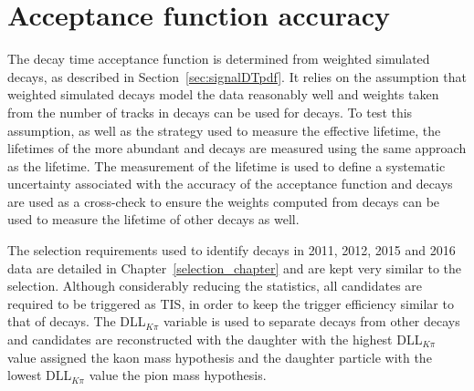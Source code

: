 \section{Acceptance function accuracy}
\label{sec:accptsyst}
The \bsmumu decay time acceptance function is determined from weighted simulated decays, as described in Section~\ref{sec:signalDTpdf}. It relies on the assumption that weighted simulated decays model the data reasonably well and weights taken from the number of tracks in \bdkpi decays can be used for \bsmumu decays. To test this assumption, as well as the strategy used to measure the \bsmumu effective lifetime, the lifetimes of the more abundant \bdkpi and \bskk decays are measured using the same approach as the \bsmumu lifetime.
The measurement of the \bdkpi lifetime is used to define a systematic uncertainty associated with the accuracy of the acceptance function and \bskk decays are used as a cross-check to ensure the weights computed from \bdkpi decays can be used to measure the lifetime of other decays as well.



The selection requirements used to identify \bdkpi decays in 2011, 2012, 2015 and 2016 data are detailed in Chapter~\ref{selection_chapter} and are kept very similar to the \bsmumu selection. Although considerably reducing the statistics, all candidates are required to be triggered as TIS, in order to keep the \bhh trigger efficiency similar to that of \bsmumu decays. %
The DLL$_{K\pi}$ variable is used to separate \bdkpi decays from other \bhh decays and candidates are reconstructed with the daughter with the highest DLL$_{K\pi}$ value assigned the kaon mass hypothesis and the daughter particle with the lowest DLL$_{K\pi}$ value the pion mass hypothesis.

